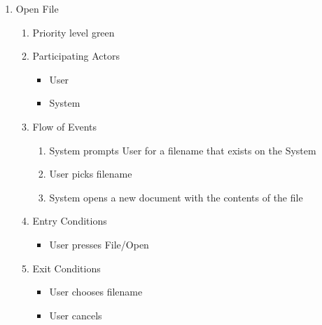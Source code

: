 \documentclass[a4paper, 12pt]{article}
\begin{document}
\begin{enumerate}
\begin {enumerate}
\begin {enumerate}
		\end {enumerate}

	\end {enumerate}


	\item{Open File}
	\begin{enumerate}
		\item{Priority} level green
		\item{Participating Actors}
		\begin {itemize}
			\item User
			\item System
		\end{itemize}
		\item{Flow of Events}
		\begin{enumerate}
			\item {System prompts User for a filename that exists on the System}
			\item {User picks filename}
			\item {System opens a new document with the contents of the file}
		\end{enumerate}
		\item {Entry Conditions}
		\begin{itemize}
			\item User presses File/Open
		\end{itemize}
		\item Exit Conditions
		\begin{itemize}
			\item User chooses filename
			\item User cancels
		\end{itemize}
	\end {enumerate}


\end{enumerate}
\end{document}
